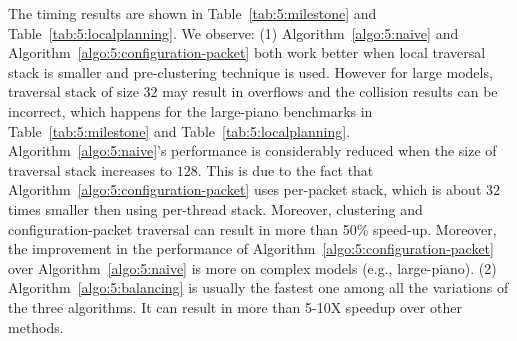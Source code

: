 \begin{table}[htb]
\begin{center}
\end{center}
\caption[Comparison of different CPU-based and GPU-based algorithms in the local planning component of PRM motion planner]{Comparison of different algorithms in local planning (timing in milliseconds). 32 and 128 are the
different sizes used for the traversal stack; C and no-C means using pre-clustering and not using pre-clustering, respectively; timing of Algorithm~\ref{algo:5:balancing} includes two parts: traversal part and balancing part.}\label{tab:5:localplanning}
\end{table}

The timing results are shown in Table~\ref{tab:5:milestone} and Table~\ref{tab:5:localplanning}. We observe: (1) Algorithm~\ref{algo:5:naive} and Algorithm~\ref{algo:5:configuration-packet} both work better when local traversal stack is smaller and
pre-clustering technique is used. However for large models, traversal stack of size $32$ may result in overflows and the
collision results can be incorrect, which happens for the large-piano benchmarks in Table~\ref{tab:5:milestone} and Table~\ref{tab:5:localplanning}. Algorithm~\ref{algo:5:naive}'s performance is considerably reduced when the size of traversal stack
increases to $128$. This is due to the fact that Algorithm~\ref{algo:5:configuration-packet} uses per-packet stack,
which is about $32$ times smaller then using per-thread stack. Moreover, clustering and  configuration-packet traversal
can result in more than 50\% speed-up. Moreover, the improvement in the performance of
Algorithm~\ref{algo:5:configuration-packet} over Algorithm~\ref{algo:5:naive} is more on complex models (e.g., large-piano).
(2) Algorithm~\ref{algo:5:balancing} is usually the fastest one among all the variations of the three algorithms.
It can result in more than 5-10X speedup over other methods.

